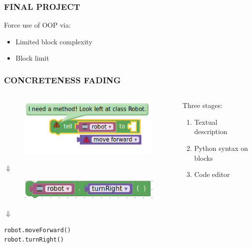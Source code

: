 \documentclass{beamer}
\let\theframetitle\frametitle
\renewcommand\frametitle[1]{\theframetitle{\MakeUppercase{#1}}}
\begin{document}
\begin{frame}
\frametitle{Final Project}
Force use of OOP via:
\begin{itemize}
\item Limited block complexity
\item Block limit
\end{itemize}
\end{frame}

\begin{frame}[fragile]
\frametitle{Concreteness Fading}
\begin{columns}[onlytextwidth]
  \begin{column}{.45\textwidth}
    \begin{figure}
      \includegraphics[width=\textwidth]{../report/block_unfaded}
    \end{figure}
    \vspace{-7mm}\centerline{$\Downarrow $}\vspace{-2.5mm}
    \begin{figure}
      \includegraphics[width=\textwidth]{../report/block_faded}
    \end{figure}
    \vspace{-5mm}\centerline{$\Downarrow $}\vspace{-2.5mm}
\begin{verbatim}
robot.moveForward()
robot.turnRight()
\end{verbatim}
  \end{column}
  \begin{column}{.45\textwidth}
    Three stages:
    \begin{enumerate}
    \item Textual description
    \item Python syntax on blocks
    \item Code editor
    \end{enumerate}
  \end{column}
\end{columns}
\end{frame}
\end{document}
